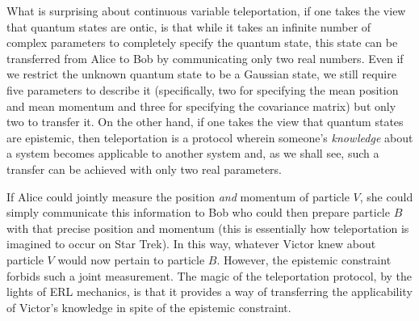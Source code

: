 \documentclass[pra,superscriptaddress,nofootinbib,12pt]{revtex4-2}
\begin{document}
What is surprising about continuous variable teleportation, if one takes the view that quantum states are ontic, is that while it takes an infinite number of complex parameters to completely specify the quantum state, this state can be transferred from Alice to Bob by communicating only two real numbers.  Even if we restrict the unknown quantum state to be a Gaussian state, we still require five parameters to describe it (specifically, two for specifying the mean position and mean momentum and three for specifying the covariance matrix) but only two to transfer it.  On the other hand, if one takes the view that quantum states are epistemic, then teleportation is a protocol wherein someone's \emph{knowledge} about a system becomes applicable to another system and, as we shall see, such a transfer can be achieved with only two real parameters.

If Alice could jointly measure the position \emph{and} momentum of particle $V$, she could simply communicate this information to Bob who could then prepare particle $B$ with that precise position and momentum (this is essentially how teleportation is imagined to occur on Star Trek).  In this way, whatever Victor knew about particle $V$ would now pertain to particle $B$.   However, the epistemic constraint forbids such a joint measurement.  The magic of the teleportation protocol, by the lights of ERL mechanics, is that it provides a way of transferring the applicability of Victor's knowledge in spite of the epistemic constraint.
\end{document}
